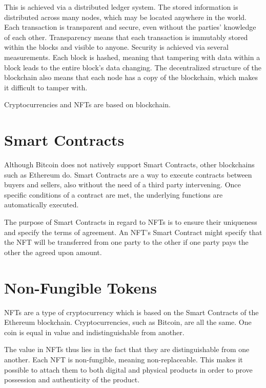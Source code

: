This is achieved via a distributed ledger system. The stored information is distributed across many nodes, which may be located anywhere in the world. Each transaction is transparent and secure, even without the parties' knowledge of each other. Transparency means that each transaction is immutably stored within the blocks and visible to anyone. Security is achieved via several measurements. Each block is hashed, meaning that tampering with data within a block leads to the entire block's data changing. The decentralized structure of the blockchain also means that each node has a copy of the blockchain, which makes it difficult to tamper with. \cite{blockchain}

Cryptocurrencies and NFTs are based on blockchain.


%
%
\section{Smart Contracts}
\label{sec:bg_tech:smartcontracts}
Although Bitcoin does not natively support Smart Contracts, other blockchains such as Ethereum do. Smart Contracts are a way to execute contracts between buyers and sellers, also without the need of a third party intervening. Once specific conditions of a contract are met, the underlying functions are automatically executed. \cite{smartContracts}

The purpose of Smart Contracts in regard to NFTs is to ensure their uniqueness and specify the terms of agreement. An NFT's Smart Contract might specify that the NFT will be transferred from one party to the other if one party pays the other the agreed upon amount.


%
%
\section{Non-Fungible Tokens}
\label{sec:bg_tech:nfts}
NFTs are a type of cryptocurrency which is based on the Smart Contracts of the Ethereum blockchain. Cryptocurrencies, such as Bitcoin, are all the same. One coin is equal in value and indistinguishable from another. \cite{nftOverview}

The value in NFTs thus lies in the fact that they are distinguishable from one another. Each NFT is non-fungible, meaning non-replaceable. This makes it possible to attach them to both digital and physical products in order to prove possession and authenticity of the product. \cite{nftOverview}

